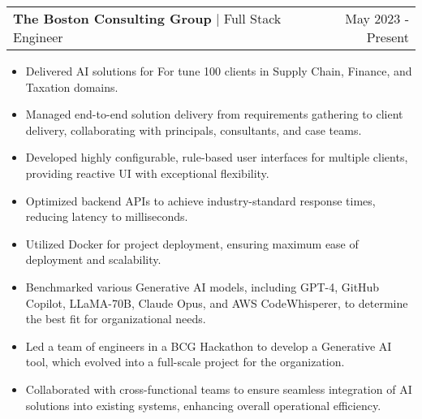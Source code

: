 \documentclass[a4paper,12pt]{article}
\makeatletter
\newenvironment{jobshort}[2]
    {
    \begin{tabularx}{\linewidth}{@{}l X r@{}}
    \textbf{#1} & \hfill &  #2 \\[3.75pt]
    \end{tabularx}
    }
    {
    }
\newenvironment{joblong}[3]
    {
    \begin{tabularx}{\linewidth}{@{}l X r@{}}
    \textbf{#1} | #2 & \hfill &  #3 \\[3.75pt]
    \end{tabularx}
    \begin{minipage}[t]{\linewidth}
    \begin{itemize}[nosep,after=\strut, leftmargin=1em, itemsep=3pt,label=-]
    }
    {
    \end{itemize}
    \end{minipage}    
    }
\makeatother
\begin{document}


\begin{joblong}{The Boston Consulting Group}{Full Stack Engineer}{May 2023 - Present}
    
\item Delivered AI solutions for For tune 100 clients in Supply Chain, Finance, and Taxation domains.
\item Managed end-to-end solution delivery from requirements gathering to client delivery, collaborating with principals, consultants, and case teams.
\item Developed highly configurable, rule-based user interfaces for multiple clients, providing reactive UI with exceptional flexibility.
\item Optimized backend APIs to achieve industry-standard response times, reducing latency to milliseconds.
\item Utilized Docker for project deployment, ensuring maximum ease of deployment and scalability.
\item Benchmarked various Generative AI models, including GPT-4, GitHub Copilot, LLaMA-70B, Claude Opus, and AWS CodeWhisperer, to determine the best fit for organizational needs.
\item Led a team of engineers in a BCG Hackathon to develop a Generative AI tool, which evolved into a full-scale project for the organization.
\item Collaborated with cross-functional teams to ensure seamless integration of AI solutions into existing systems, enhancing overall operational efficiency.

\end{joblong}
\end{document}

